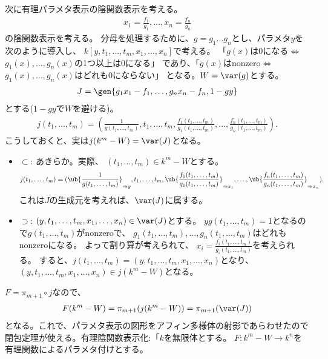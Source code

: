 次に有理パラメタ表示の陰関数表示を考える。
\begin{align}
  x_1 = \frac{f_1}{g_1},\dots,x_n=\frac{f_n}{g_n}
\end{align}
の陰関数表示を考える。
分母を処理するために、$g=g_1 \dots g_n$とし、パラメタ$y$を次のように導入し、
$k[y,t_1,\dots,t_m,x_1,\dots,x_n]$で考える。
「$g(x)$は0になる$\iff$ $g_1(x),\dots,g_n(x)$の1つ以上は0になる」
であり、「$g(x)$はnonzero$\iff$ $g_1(x),\dots,g_n(x)$はどれも0にならない」
となる。$W=\var(g)$とする。
\begin{align}
  J=\gen{g_1x_1-f_1,\dots,g_n x_n - f_n , 1-gy}
\end{align}
とする($1-gy$で$W$を避ける)。
\begin{align}
  j(t_1,\dots,t_m)=
  (\frac{1}{g(t_1,\dots,t_m)},
  t_1,\dots,t_m,
  \frac{f_1(t_1,\dots,t_m)}{g_1(t_1,\dots,t_m)},
  \dots,
  \frac{f_n(t_1,\dots,t_m)}{g_n(t_1,\dots,t_m)}).
\end{align}
こうしておくと、実は$j(k^m-W)=\var(J)$となる。
\begin{myproof}
  \begin{itemize}
    \item $\subset$:
    あきらか。実際、
    $(t_1,\dots,t_m) \in k^m-W$とする。
    \begin{align}
      j(t_1,\dots,t_m)=
      (\ub{\frac{1}{g(t_1,\dots,t_m)}}_{\Rightarrow y},t_1,\dots,t_m,
      \ub{\frac{f_1(t_1,\dots,t_m)}{g_1(t_1,\dots,t_m)}}_{\Rightarrow x_1},\dots, \ub{\frac{f_n(t_1,\dots,t_m)}{g_n(t_1,\dots,t_m)}}_{\Rightarrow x_n}).
    \end{align}
    これは$J$の生成元を考えれば、$\var(J)$に属する。
    \item $\supset$:
    $(y,t_1,\dots,t_m,x_1,\dots,x_n)\in \var(J)$とする。
    $yg(t_1,\dots,t_m)=1$となるので$g(t_1,\dots,t_m)$がnonzeroで、
    $g_1(t_1,\dots,t_m),\dots,g_n(t_1,\dots,t_m)$はどれもnonzeroになる。
    よって割り算が考えられて、
    $x_i = \frac{f_i(t_1,\dots,t_m)}{g_i(t_1,\dots,t_m)}$を考えられる。
    すると、$j(t_1,\dots,t_m)=(y,t_1,\dots,t_m,x_1,\dots,x_n)$となり、
    $(y,t_1,\dots,t_m,x_1,\dots,x_n)\in j(k^m-W)$となる。
  \end{itemize}
\end{myproof}
$F=\pi_{m+1}\circ j$なので、
\begin{align}
  F(k^m-W)=\pi_{m+1}(j(k^m-W))=\pi_{m+1}(\var(J))
\end{align}
となる。これで、パラメタ表示の図形をアフィン多様体の射影であらわせたので閉包定理が使える。有理陰関数表示化:「$k$を無限体とする。
$F\colon k^m - W \to k^n$を有理関数によるパラメタ付けとする。
